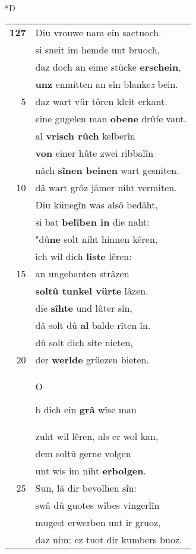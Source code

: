 \documentclass[8pt,a4paper,notitlepage]{article}
\begin{document}
\begin{table}[ht]
\begin{minipage}[t]{0.5\linewidth}
\small
\begin{center}*D
\end{center}
\begin{tabular}{rl}
\textbf{127} & Diu vrouwe nam ein sactuoch.\\ 
 & si sneit im hemde unt bruoch,\\ 
 & daz doch an eime stücke \textbf{erschein},\\ 
 & \textbf{unz} enmitten an sîn blanke\textit{z} bein.\\ 
5 & daz wart vür tôren kleit erkant.\\ 
 & eine gugelen man \textbf{obene} drûfe vant.\\ 
 & al \textbf{vrisch rûch} kelberîn\\ 
 & \textbf{von} einer hûte zwei ribbalîn\\ 
 & nâch \textbf{sînen beinen} wart gesniten.\\ 
10 & dâ wart grôz jâmer niht vermiten.\\ 
 & Diu künegîn was alsô bedâht,\\ 
 & si bat \textbf{belîben in} die naht:\\ 
 & "dû\textbf{ne} solt niht hinnen kêren,\\ 
 & ich wil dich \textbf{liste} lêren:\\ 
15 & an ungebanten strâzen\\ 
 & \textbf{soltû tunkel vürte} lâzen.\\ 
 & die \textbf{sîhte} und lûter sîn,\\ 
 & dâ solt dû \textbf{al} balde rîten în.\\ 
 & dû solt dich site nieten,\\ 
20 & der \textbf{werlde} grüezen bieten.\\ 
 & \begin{large}O\end{large}b dich ein \textbf{grâ} wîse man\\ 
 & zuht wil lêren, als er wol kan,\\ 
 & dem soltû gerne volgen\\ 
 & unt wis im niht \textbf{erbolgen}.\\ 
25 & Sun, lâ dir bevolhen sîn:\\ 
 & swâ dû guotes wîbes vingerlîn\\ 
 & mugest erwerben unt ir gruoz,\\ 
 & daz nim; ez tuot dir kumbers buoz.\\ 

\end{tabular}
\end{minipage}
\end{table}
\end{document}
